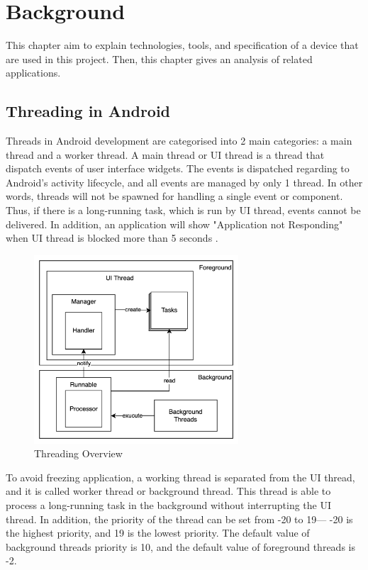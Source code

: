 \chapter{Background}\label{background}

    This chapter aim to explain technologies, tools, and specification of a device that are used in this project.
    Then, this chapter gives an analysis of related applications.

    \section{Threading in Android}
        Threads in Android development are categorised into 2 main categories: a main thread and a worker thread.
        A main thread or UI thread is a thread that dispatch events of user interface widgets.
        The events is dispatched regarding to Android's activity lifecycle,
        and all events are managed by only 1 thread.
        In other words, threads will not be spawned for handling a single event or component.
        Thus, if there is a long-running task, which is run by UI thread, events cannot be delivered.
        In addition, an application will show "Application not Responding"
        when UI thread is blocked more than 5 seconds \cite{ANDROID-01}.

        \begin{figure}[!ht]
            \centering
            \includegraphics[width=3in]{images/chapter2/thread-overview.png}
            \caption{Threading Overview}
            \label{thread-overview}
        \end{figure}

        To avoid freezing application, a working thread is separated from the UI thread,
            and it is called worker thread or background thread.
            This thread is able to process a long-running task in the background without interrupting the UI thread.
        In addition, the priority of the thread can be set from -20 to 19--- -20
            is the highest priority, and 19 is the lowest priority.
            The default value of background threads priority is 10,
            and the default value of foreground threads is -2.

